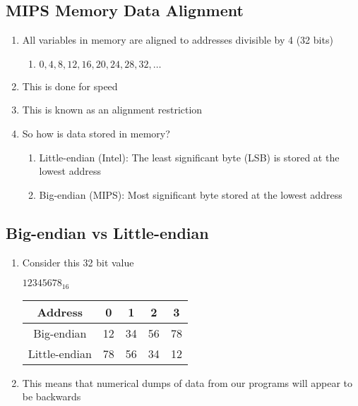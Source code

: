 \documentclass[12pt]{article}
\begin{document}
\subsection{MIPS Memory Data Alignment}
\begin{enumerate}
  \item All variables in memory are aligned to addresses divisible by 4 (32 bits)
  \begin{enumerate}
    \item[] $0,4,8,12,16,20,24,28,32,\dots$
  \end{enumerate}
  \item This is done for speed
  \item This is known as an alignment restriction
  \item So how is data stored in memory?
  \begin{enumerate}
    \item Little-endian (Intel): The least significant byte (LSB) is stored at the lowest address
    \item Big-endian (MIPS): Most significant byte stored at the lowest address
  \end{enumerate}
\end{enumerate}



\subsection{Big-endian vs Little-endian}
\begin{enumerate}
  \item Consider this 32 bit value
  \begin{center}
    $12345678_{16}$\\
    \begin{tabular}{|c|c|c|c|c|} \hline
      Address & 0 & 1 & 2 & 3 \\ \hline
      Big-endian & 12 & 34 & 56 & 78 \\ \hline
      Little-endian & 78 & 56 & 34 & 12 \\ \hline
    \end{tabular}
  \end{center}
  \item This means that numerical dumps of data from our programs will appear to be backwards
\end{enumerate}
\end{document}
